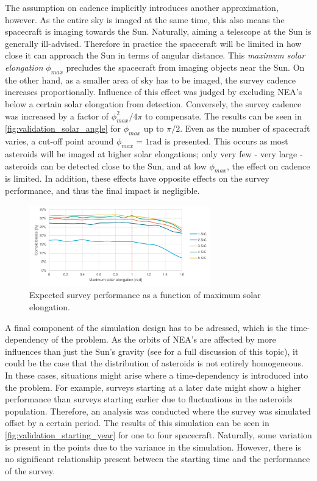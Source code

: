 The assumption on cadence implicitly introduces another approximation, however. As the entire sky is imaged at the same time, this also means the spacecraft is imaging towards the Sun. Naturally, aiming a telescope at the Sun is generally ill-advised. Therefore in practice the spacecraft will be limited in how close it can approach the Sun in terms of angular distance. This \textit{maximum solar elongation} $\phi_{max}$ precludes the spacecraft from imaging objects near the Sun. On the other hand, as a smaller area of sky has to be imaged, the survey cadence increases proportionally. Influence of this effect was judged by excluding NEA's below a certain solar elongation from detection. Conversely, the survey cadence was increased by a factor of $\phi_{max}^2 / 4\pi$ to compensate. The results can be seen in \autoref{fig:validation_solar_angle} for $\phi_{max}$ up to $\pi/2$. Even as the number of spacecraft varies, a cut-off point around $\phi_{max} = 1\mathrm{rad}$ is presented. This occurs as most asteroids will be imaged at higher solar elongations; only very few - very large - asteroids can be detected close to the Sun, and at low $\phi_{max}$, the effect on cadence is limited. In addition, these effects have opposite effects on the survey performance, and thus the final impact is negligible.

\begin{figure}[htbp]
 \centering
 \includegraphics[width=0.7\textwidth]{img/validation_solar_angle.pdf}
 \caption{Expected survey performance as a function of maximum solar elongation.}
 \label{fig:validation_solar_angle}
\end{figure}

A final component of the simulation design has to be adressed, which is the time-dependency of the problem. As the orbits of NEA's are affected by more influences than just the Sun's gravity (see \cite{GranvikPopulation} for a full discussion of this topic), it could be the case that the distribution of asteroids is not entirely homogeneous. In these cases, situations might arise where a time-dependency is introduced into the problem. For example, surveys starting at a later date might show a higher performance than surveys starting earlier due to fluctuations in the asteroids population. Therefore, an analysis was conducted where the survey was simulated offset by a certain period. The results of this simulation can be seen in \autoref{fig:validation_starting_year} for one to four spacecraft. Naturally, some variation is present in the points due to the variance in the simulation. However, there is no significant relationship present between the starting time and the performance of the survey.

